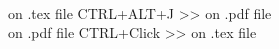 \documentclass{article}
\begin{document}
\null
\\ on .tex file CTRL+ALT+J >> on .pdf file
\\ on .pdf file CTRL+Click >> on .tex file
\end{document}
